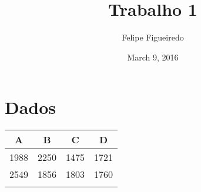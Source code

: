 \documentclass[]{article}
\title{Trabalho 1}
\author{Felipe Figueiredo}
\date{March 9, 2016}
\begin{document}
\maketitle


\section{Dados}\label{dados}

\begin{longtable}[c]{@{}cccc@{}}
\toprule
\begin{minipage}[b]{0.06\columnwidth}\centering\strut
A
\strut\end{minipage} &
\begin{minipage}[b]{0.06\columnwidth}\centering\strut
B
\strut\end{minipage} &
\begin{minipage}[b]{0.06\columnwidth}\centering\strut
C
\strut\end{minipage} &
\begin{minipage}[b]{0.06\columnwidth}\centering\strut
D
\strut\end{minipage}\tabularnewline
\midrule
\endhead
\begin{minipage}[t]{0.06\columnwidth}\centering\strut
1988
\strut\end{minipage} &
\begin{minipage}[t]{0.06\columnwidth}\centering\strut
2250
\strut\end{minipage} &
\begin{minipage}[t]{0.06\columnwidth}\centering\strut
1475
\strut\end{minipage} &
\begin{minipage}[t]{0.06\columnwidth}\centering\strut
1721
\strut\end{minipage}\tabularnewline
\begin{minipage}[t]{0.06\columnwidth}\centering\strut
2549
\strut\end{minipage} &
\begin{minipage}[t]{0.06\columnwidth}\centering\strut
1856
\strut\end{minipage} &
\begin{minipage}[t]{0.06\columnwidth}\centering\strut
1803
\strut\end{minipage} &
\begin{minipage}[t]{0.06\columnwidth}\centering\strut
1760
\strut\end{minipage}\tabularnewline
\begin{minipage}[t]{0.06\columnwidth}\centering\strut

\end{minipage}
\end{longtable}
\end{document}
